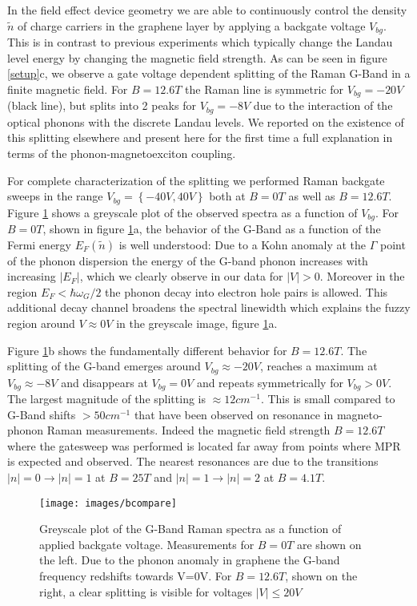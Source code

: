 \documentclass[prl,aps,superscriptaddress,showpacs,reprint]{revtex4-1}
\begin{document}
In the field effect device geometry we are able to continuously control the density $\widetilde{n}$ of charge carriers in the graphene layer by applying a backgate voltage $V_{bg}$. This is in contrast to previous experiments which typically change the Landau level energy by changing the magnetic field strength. As can be seen in figure \ref{setup}c, we observe a gate voltage dependent splitting of the Raman G-Band in a finite magnetic field. For $B=12.6T$ the Raman line is symmetric for $V_{bg}=-20V$ (black line), but splits into 2 peaks for $V_{bg}=-8V$ due to the interaction of the optical phonons with the discrete Landau levels. We reported on the existence of this splitting elsewhere \cite{kias2009} and present here for the first time a full explanation in terms of the phonon-magnetoexciton coupling.

For complete characterization of the splitting we performed Raman backgate sweeps in the range $V_{bg}=\left\lbrace -40V,40V \right\rbrace$ both at $B=0T$ as well as $B=12.6T$. Figure \ref{bcompare} shows a greyscale plot of the observed spectra as a function of $V_{bg}$.
For $B=0T$, shown in figure \ref{bcompare}a, the behavior of the G-Band as a function of the Fermi energy $E_F(\widetilde{n})$ is well understood: Due to a Kohn anomaly at the $\Gamma$ point of the phonon dispersion the energy of the G-band phonon increases with increasing $\left|E_F\right|$\cite{tsuneya2006anomaly,pisana2007breakdown,yan2007electric}, which we clearly observe in our data for $\left|V\right| > 0$. Moreover in the region $E_F<\hbar \omega_G/2$ the phonon decay into electron hole pairs is allowed. This additional decay channel broadens the spectral linewidth which explains the fuzzy region around $V\approx 0V$ in the greyscale image, figure \ref{bcompare}a. 

Figure \ref{bcompare}b shows the fundamentally different behavior for $B=12.6T$. The splitting of the G-band emerges around $V_{bg} \approx -20V$, reaches a maximum at $V_{bg} \approx -8V$ and disappears at $V_{bg} = 0V$ and repeats symmetrically for $V_{bg}>0V$. The largest magnitude of the splitting is $\approx 12cm^{-1}$. This is small compared to G-Band shifts $>50cm^{-1}$ that have been observed on resonance in magneto-phonon Raman measurements.
Indeed the magnetic field strength $B=12.6T$ where the gatesweep was performed is located far away from points where MPR is expected and observed. The nearest resonances are due to the transitions $\left|n\right|=0 \rightarrow \left|n\right|=1$ at $B=25T$ and $\left|n\right|=1 \rightarrow \left|n\right|=2$ at $B=4.1T$.  
\begin{figure}[b]
    \texttt{[image: images/bcompare]}
    \caption{\label{bcompare} Greyscale plot of the G-Band Raman spectra as a function of applied backgate voltage. Measurements for $B=0T$ are shown on the left. Due to the phonon anomaly in graphene the G-band frequency redshifts towards V=0V. For $B=12.6T$, shown on the right, a clear splitting is visible for voltages $\left|V\right|\leq 20V$}
\end{figure}
\end{document}
